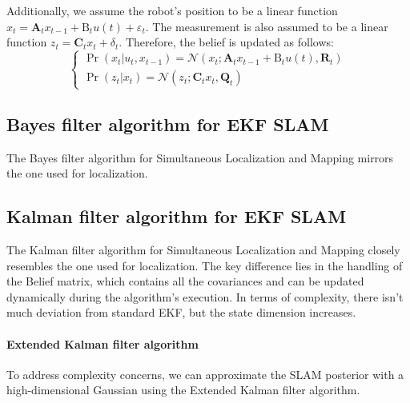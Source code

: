 Additionally, we assume the robot's position to be a linear function $x_t=\mathbf{A}_tx_{t-1}+\text{B}_tu(t)+\varepsilon_t$. 
The measurement is also assumed to be a linear function $z_t=\mathbf{C}_tx_t+\delta_t$. 
Therefore, the belief is updated as follows: 
\[\begin{cases}
    \Pr(x_t|u_t,x_{t-1})=\mathcal{N}(x_t;\mathbf{A}_tx_{t-1}+\text{B}_tu(t),\mathbf{R}_t) \\
    \Pr(z_t|x_t)=\mathcal{N}\left(z_t;\mathbf{C}_tx_t,\mathbf{Q}_t\right)
\end{cases}\]

\subsection{Bayes filter algorithm for EKF SLAM}
The Bayes filter algorithm for Simultaneous Localization and Mapping mirrors the one used for localization.

\subsection{Kalman filter algorithm for EKF SLAM}
The Kalman filter algorithm for Simultaneous Localization and Mapping closely resembles the one used for localization. 
The key difference lies in the handling of the Belief matrix, which contains all the covariances and can be updated dynamically during the algorithm's execution. 
In terms of complexity, there isn't much deviation from standard EKF, but the state dimension increases.

\paragraph*{Extended Kalman filter algorithm}
To address complexity concerns, we can approximate the SLAM posterior with a high-dimensional Gaussian using the Extended Kalman filter algorithm.


